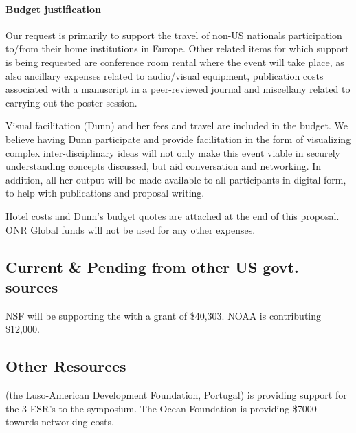 \paragraph{Budget justification} Our request is primarily to support
the travel of non-US nationals participation to/from their home
institutions in Europe. Other related items for which support is being
requested are conference room rental where the event will take place,
as also ancillary expenses related to audio/visual equipment,
publication costs associated with a manuscript in a peer-reviewed
journal and miscellany related to carrying out the poster session.

Visual facilitation (Dunn) and her fees and travel are included in the
budget. We believe having Dunn participate and provide facilitation in
the form of visualizing complex inter-disciplinary ideas will not only
make this event viable in securely understanding concepts discussed,
but aid conversation and networking. In addition, all her output will
be made available to all participants in digital form, to help with
publications and proposal writing.

Hotel costs and Dunn's budget quotes are attached at the end of this
proposal. ONR Global funds will not be used for any other expenses.

\subsection{Current \& Pending from other US govt. sources}

NSF will be supporting the \symp with a grant of \$40,303. NOAA is
contributing \$12,000.

\subsection{Other Resources}

\fla (the Luso-American Development Foundation, Portugal) is providing
support for the 3 ESR's to the symposium. The Ocean Foundation is
providing \$7000 towards networking costs.
